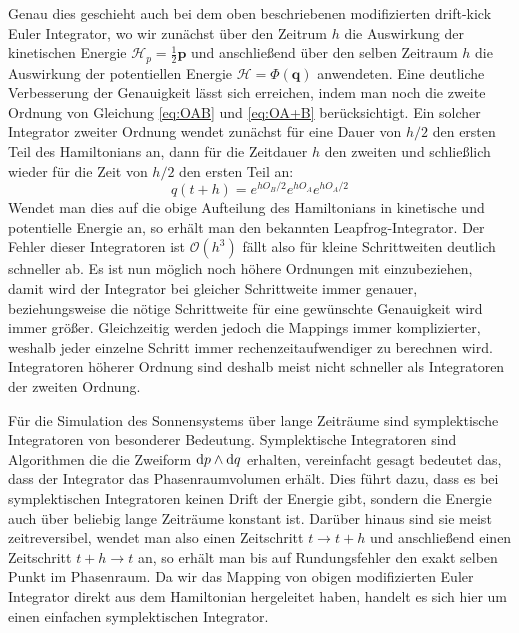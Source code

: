 \documentclass[12pt,a4paper,twoside]{article}
\renewcommand{\cite}{\citep}
\renewcommand{\vec}{\mathbf}
\renewcommand{\H}{\mathcal H}
\begin{document}
Genau dies geschieht auch bei dem oben beschriebenen modifizierten drift-kick Euler Integrator,
wo wir zunächst über den Zeitrum $h$ die Auswirkung der kinetischen Energie $\H_p=\frac{1}{2}\vec{p}$ und anschließend über den selben Zeitraum $h$ die Auswirkung der potentiellen Energie $\H=\Phi(\vec{q})$ anwendeten.
Eine deutliche Verbesserung der Genauigkeit lässt sich erreichen, indem man noch die zweite Ordnung von Gleichung \ref{eq:OAB} und \ref{eq:OA+B} berücksichtigt. Ein solcher Integrator zweiter Ordnung wendet zunächst für eine Dauer von $h/2$ den ersten Teil des Hamiltonians an, dann für die Zeitdauer $h$ den zweiten und schließlich wieder für die Zeit von $h/2$ den ersten Teil an:
\begin{equation}
q(t+h)=e^{hO_B/2}e^{hO_A}e^{hO_A/2} \label{eq:secondorder}
\end{equation}
Wendet man dies auf die obige Aufteilung des Hamiltonians in kinetische und potentielle Energie an, so erhält man den bekannten Leapfrog-Integrator\cite{Duncan1998}. Der Fehler dieser Integratoren ist $\mathcal{O}(h^3)$ fällt also für kleine Schrittweiten deutlich schneller ab\cite{Chambers1999}.
Es ist nun möglich noch höhere Ordnungen mit einzubeziehen, damit wird der Integrator bei gleicher Schrittweite immer genauer, beziehungsweise die nötige Schrittweite für eine gewünschte Genauigkeit wird immer größer. Gleichzeitig werden jedoch die Mappings immer komplizierter, weshalb jeder einzelne Schritt immer rechenzeitaufwendiger zu berechnen wird. Integratoren höherer Ordnung sind deshalb meist nicht schneller als Integratoren der zweiten Ordnung\cite{Chambers1999}.

Für die Simulation des Sonnensystems über lange Zeiträume sind symplektische Integratoren von besonderer Bedeutung. Symplektische Integratoren sind Algorithmen die die Zweiform $\dif p \wedge \dif q$ erhalten, vereinfacht gesagt bedeutet das, dass der Integrator das Phasenraumvolumen erhält\cite{Duncan1998}. Dies führt dazu, dass es bei symplektischen Integratoren keinen Drift der Energie gibt, sondern die Energie auch über beliebig lange Zeiträume konstant ist\cite{Binney2008}. Darüber hinaus sind sie meist zeitreversibel, wendet man also einen Zeitschritt $t\to t+h$ und anschließend einen Zeitschritt $t+h\to t$ an, so erhält man bis auf Rundungsfehler den exakt selben Punkt im Phasenraum\cite{Duncan1998}.
Da wir das Mapping von obigen modifizierten Euler Integrator direkt aus dem Hamiltonian hergeleitet haben, handelt es sich hier um einen einfachen symplektischen Integrator\cite{Binney2008}.
\end{document}
